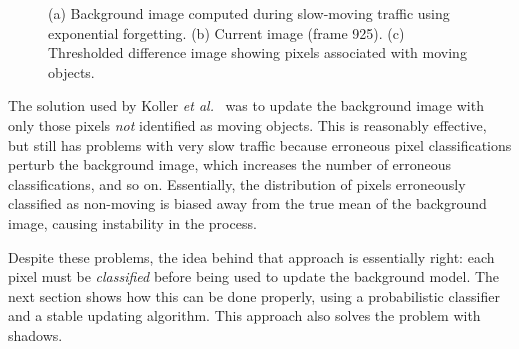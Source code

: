 \begin{figure}[t]
\caption{(a) Background image computed during slow-moving traffic
using exponential forgetting. (b) Current image (frame 925). (c) Thresholded
difference image showing pixels associated with moving objects.}
\label{slow-traffic-figure}
\end{figure}

The solution used by Koller {\em et al.}~
was to update the background image with only those pixels
{\em not} identified as moving objects. This is reasonably effective,
but still has problems with very slow traffic because erroneous
pixel classifications perturb the background image, which increases
the number of erroneous classifications, and so on. Essentially, the
distribution of pixels erroneously classified as non-moving is biased
away from the true mean of the background image, causing
instability in the process.

Despite these problems, the idea behind that approach is
essentially right: each pixel must be {\em classified} before being
used to update the background model. The next section shows how this
can be done properly, using a probabilistic classifier and a stable
updating algorithm. This approach also solves the problem with shadows.



